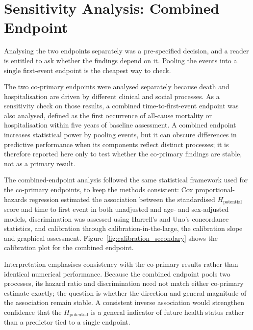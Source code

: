 \section{Sensitivity Analysis: Combined Endpoint}
\label{sec:sensitivity_combined}

\noindent Analysing the two endpoints separately was a pre-specified decision, and a reader is entitled to ask whether the findings depend on it. Pooling the events into a single first-event endpoint is the cheapest way to check.

\noindent The two co-primary endpoints were analysed separately because death and hospitalisation are driven by different clinical and social processes. As a sensitivity check on those results, a combined time-to-first-event endpoint was also analysed, defined as the first occurrence of all-cause mortality or hospitalisation within five years of baseline assessment. A combined endpoint increases statistical power by pooling events, but it can obscure differences in predictive performance when its components reflect distinct processes; it is therefore reported here only to test whether the co-primary findings are stable, not as a primary result.

The combined-endpoint analysis followed the same statistical framework used for the co-primary endpoints, to keep the methods consistent: Cox proportional-hazards regression estimated the association between the standardised $H_{\text{potential}}$ score and time to first event in both unadjusted and age- and sex-adjusted models, discrimination was assessed using Harrell's and Uno's concordance statistics, and calibration through calibration-in-the-large, the calibration slope and graphical assessment. Figure~\ref{fig:calibration_secondary} shows the calibration plot for the combined endpoint.

Interpretation emphasises consistency with the co-primary results rather than identical numerical performance. Because the combined endpoint pools two processes, its hazard ratio and discrimination need not match either co-primary estimate exactly; the question is whether the direction and general magnitude of the association remain stable. A consistent inverse association would strengthen confidence that the $H_{\text{potential}}$ is a general indicator of future health status rather than a predictor tied to a single endpoint.

